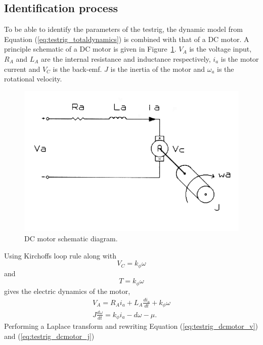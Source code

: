 \subsection{Identification process}
To be able to identify the parameters of the testrig, the dynamic model from
Equation (\ref{eq:testrig_totaldynamics}) is combined with that of a DC motor. A
principle schematic of a DC motor is given in
Figure~\ref{fig:testrig_dcmotor_model}. $V_A$ is the voltage input, $R_A$ and
$L_A$ are the internal resistance and inductance respectively, $i_a$ is the
motor current and $V_C$ is the back-emf. $J$ is the inertia of the motor and
$\omega_a$ is the rotational velocity.
\begin{figure}[H]
    \label{fig:testrig_dcmotor_model}
    \centering
    \includegraphics[width=\textwidth]{./img/testrig_dcmotor_model.png}
    \caption{DC motor schematic diagram.}
\end{figure}
Using Kirchoffs loop rule along with 
\begin{equation} \label{eq:testrig_kphi_v}
    V_C = k_{\phi} \omega
\end{equation}
and 
\begin{equation} \label{eq:testrig_kphi_i}
    T = k_{\phi} \omega
\end{equation}
gives the electric dynamics of the motor,
\begin{align} 
    V_A = R_A i_a + L_A \frac{di_a}{dt} + k_{\phi}\omega \label{eq:testrig_dcmotor_v}\\
    J \frac{d\omega} {dt} = k_{\phi} i_a - d\omega - \mu. \label{eq:testrig_dcmotor_j}
\end{align}
Performing a Laplace transform and rewriting Equation (\ref{eq:testrig_dcmotor_v}) and (\ref{eq:testrig_dcmotor_j})
